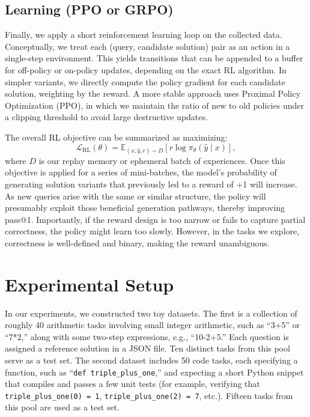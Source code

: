 \documentclass{article}
\begin{document}
\subsection{Learning (PPO or GRPO)}
Finally, we apply a short reinforcement learning loop on the collected data. Conceptually, we treat each (query, candidate solution) pair as an action in a single-step environment. This yields transitions that can be appended to a buffer for off-policy or on-policy updates, depending on the exact RL algorithm. In simpler variants, we directly compute the policy gradient for each candidate solution, weighting by the reward. A more stable approach uses Proximal Policy Optimization (PPO), in which we maintain the ratio of new to old policies under a clipping threshold to avoid large destructive updates.

The overall RL objective can be summarized as maximizing:
\[
\mathcal{L}_{\text{RL}}(\theta) = \mathbb{E}_{(x, \hat{y}, r)\sim D}\left[r \log \pi_\theta(\hat{y}\mid x)\right],
\]
where $D$ is our replay memory or ephemeral batch of experiences. Once this objective is applied for a series of mini-batches, the model’s probability of generating solution variants that previously led to a reward of +1 will increase. As new queries arise with the same or similar structure, the policy will presumably exploit those beneficial generation pathways, thereby improving pass@1. Importantly, if the reward design is too narrow or fails to capture partial correctness, the policy might learn too slowly. However, in the tasks we explore, correctness is well-defined and binary, making the reward unambiguous. 

\section{Experimental Setup}
In our experiments, we constructed two toy datasets. The first is a collection of roughly 40 arithmetic tasks involving small integer arithmetic, such as “3+5” or “7*2,” along with some two-step expressions, e.g., “10-2+5.” Each question is assigned a reference solution in a JSON file. Ten distinct tasks from this pool serve as a test set. The second dataset includes 50 code tasks, each specifying a function, such as “\texttt{def triple\_plus\_one},” and expecting a short Python snippet that compiles and passes a few unit tests (for example, verifying that \texttt{triple\_plus\_one(0) = 1}, \texttt{triple\_plus\_one(2) = 7}, etc.). Fifteen tasks from this pool are used as a test set.
\end{document}
